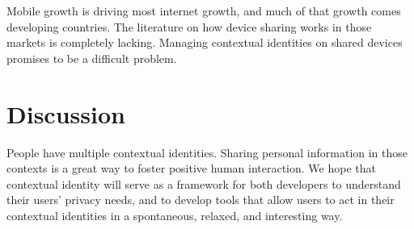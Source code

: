 \documentclass[10pt, conference, compsocconf]{IEEEtran}
\begin{document}
Mobile growth is driving most internet growth, and much of that growth comes
developing countries. The literature on how device sharing works in those
markets is completely lacking. Managing contextual identities on shared devices
promises to be a difficult problem.

\section{Discussion}
People have multiple contextual identities. Sharing personal information in
those contexts is a great way to foster positive human interaction.  We hope
that contextual identity will serve as a framework for both developers to
understand their users' privacy needs, and to develop tools that allow users to
act in their contextual identities in a spontaneous, relaxed, and interesting
way.

\begin{comment}
papers:
expectation of privacy\cite{viegas}
http://jcmc.indiana.edu/vol10/issue3/viegas.html

danah boyd
making sense of privacy and publicity: whose voice counts? does your child's
teacher have a right to be public in her other roles online? does she have a
right to be secular? religious? friend? lover? if you work for company X and
you disagree with their policies, are you allowed to be public about
that:?\cite{boyd2}

close to you “stranger on a train” “stranger on a plane”
first party regrets, third party regrets
impossible to judge how big friends of friends

\end{comment}

\begin{comment}
\section{Acknowledgements}
The authors thank
Lucas Adamski
Ben Adida
Mike Connor
Ed Lee
\end{comment}



\end{document}
